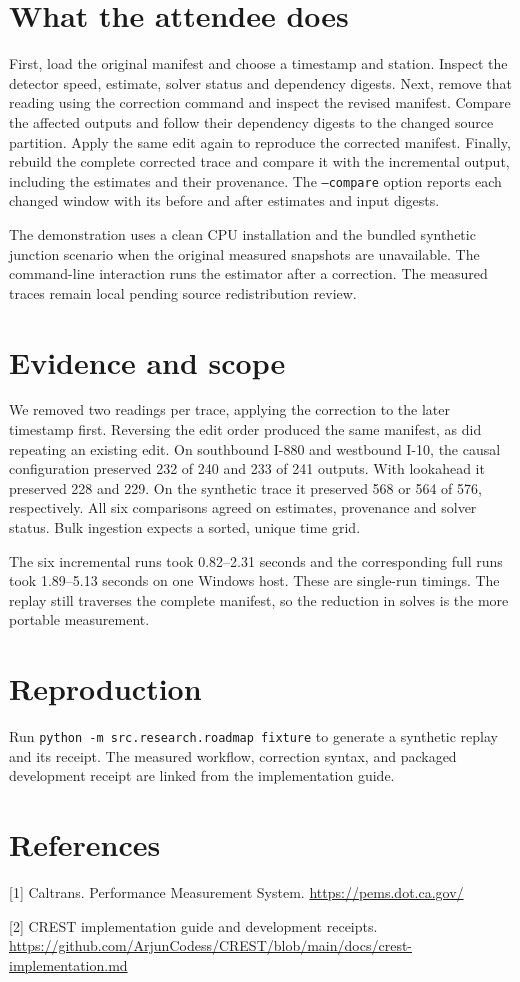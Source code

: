 \documentclass[sigconf,nonacm]{acmart}
\begin{document}
\section*{What the attendee does}
First, load the original manifest and choose a timestamp and station. Inspect the detector
speed, estimate, solver status and dependency digests. Next, remove that reading using the
correction command and inspect the revised manifest. Compare the affected outputs and follow
their dependency digests to the changed source partition. Apply the same edit again to reproduce
the corrected manifest. Finally, rebuild the complete corrected trace and compare it with the
incremental output, including the estimates and their provenance. The \texttt{--compare}
option reports each changed window with its before and after estimates and input digests.

The demonstration uses a clean CPU installation and the bundled synthetic junction scenario when
the original measured snapshots are unavailable. The command-line interaction runs the estimator
after a correction. The measured traces remain local pending source redistribution review.

\section*{Evidence and scope}
We removed two readings per trace, applying the correction to the later timestamp first.
Reversing the edit order produced the same manifest, as did repeating an existing edit.
On southbound I-880 and westbound I-10, the causal configuration preserved 232 of 240 and
233 of 241 outputs. With lookahead it preserved 228 and 229. On the synthetic trace it
preserved 568 or 564 of 576, respectively. All six comparisons agreed on estimates, provenance
and solver status. Bulk ingestion expects a sorted, unique time grid.

The six incremental runs took 0.82--2.31 seconds and the corresponding full runs took
1.89--5.13 seconds on one Windows host. These are single-run timings. The replay still traverses
the complete manifest, so the reduction in solves is the more portable measurement.

\section*{Reproduction}
Run \texttt{python -m src.research.roadmap fixture} to generate a synthetic replay and its
receipt. The measured workflow, correction syntax, and packaged development receipt are linked
from the implementation guide.

\section*{References}
[1] Caltrans. Performance Measurement System. \url{https://pems.dot.ca.gov/}

[2] CREST implementation guide and development receipts.
\url{https://github.com/ArjunCodess/CREST/blob/main/docs/crest-implementation.md}
\end{document}
